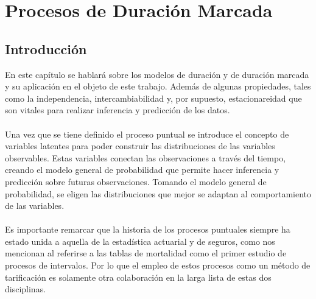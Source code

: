 \chapter{Procesos de Duraci\'on Marcada}
\section{Introducci\'on}
En este cap\'itulo se hablar\'a sobre los modelos de duraci\'on y de duraci\'on marcada y su aplicaci\'on en el objeto de este trabajo. Adem\'as de algunas propiedades, tales como la independencia, intercambiabilidad y, por supuesto, estacionareidad que son vitales para realizar inferencia y predicci\'on de los datos.\\
\\
Una vez que se tiene definido el proceso puntual se introduce el concepto de variables latentes para poder construir las distribuciones de las variables observables. Estas variables conectan las observaciones a trav\'es del tiempo, creando el modelo general de probabilidad que permite hacer inferencia y predicci\'on sobre futuras observaciones. Tomando el modelo general de probabilidad, se eligen las distribuciones que mejor se adaptan al comportamiento de las variables.\\
\\
Es importante remarcar que la historia de los procesos puntuales siempre ha estado unida a aquella de la estad\'istica actuarial y de seguros, como nos mencionan \cite{daley2003} al referirse a las tablas de mortalidad como el primer estudio de procesos de intervalos. Por lo que el empleo de estos procesos como un m\'etodo de tarificaci\'on es solamente otra colaboraci\'on en la larga lista de estas dos disciplinas.
\\
